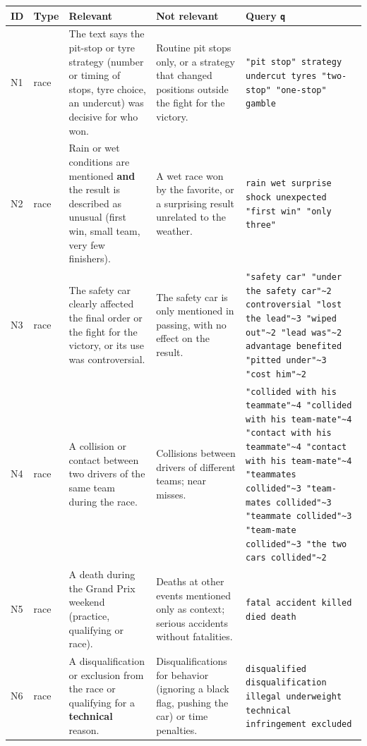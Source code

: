 \documentclass[sigconf]{acmart}
\begin{document}
{\small
\renewcommand{\arraystretch}{1.15}
\begin{longtable}{p{0.6cm}p{1.2cm}p{5.6cm}p{5.2cm}p{4.2cm}}
  \toprule
  ID & Type & Relevant & Not relevant & Query \texttt{q} \\
  \midrule
  \endhead
  N1 & race & The text says the pit-stop or tyre strategy (number or timing of
  stops, tyre choice, an undercut) was decisive for who won. & Routine pit
  stops only, or a strategy that changed positions outside the fight for the
  victory. & \texttt{"pit stop" strategy undercut tyres "two-stop" "one-stop"
  gamble} \\
  N2 & race & Rain or wet conditions are mentioned \textbf{and} the result is
  described as unusual (first win, small team, very few finishers). & A wet
  race won by the favorite, or a surprising result unrelated to the weather.
  & \texttt{rain wet surprise shock unexpected "first win" "only three"} \\
  N3 & race & The safety car clearly affected the final order or the fight
  for the victory, or its use was controversial. & The safety car is only
  mentioned in passing, with no effect on the result. & \texttt{"safety car"
  "under the safety car"\textasciitilde 2 controversial "lost the
  lead"\textasciitilde 3 "wiped out"\textasciitilde 2 "lead
  was"\textasciitilde 2 advantage benefited "pitted under"\textasciitilde 3
  "cost him"\textasciitilde 2} \\
  N4 & race & A collision or contact between two drivers of the same team
  during the race. & Collisions between drivers of different teams; near
  misses. & \texttt{"collided with his teammate"\textasciitilde 4 "collided
  with his team-mate"\textasciitilde 4 "contact with his
  teammate"\textasciitilde 4 "contact with his team-mate"\textasciitilde 4
  "teammates collided"\textasciitilde 3 "team-mates collided"\textasciitilde 3
  "teammate collided"\textasciitilde 3 "team-mate collided"\textasciitilde 3
  "the two cars collided"\textasciitilde 2} \\
  N5 & race & A death during the Grand Prix weekend (practice, qualifying or
  race). & Deaths at other events mentioned only as context; serious
  accidents without fatalities. & \texttt{fatal accident killed died death}
  \\
  N6 & race & A disqualification or exclusion from the race or qualifying for
  a \textbf{technical} reason. & Disqualifications for behavior (ignoring a
  black flag, pushing the car) or time penalties. & \texttt{disqualified
  disqualification illegal underweight technical infringement excluded} \\

\end{longtable}}
\end{document}
